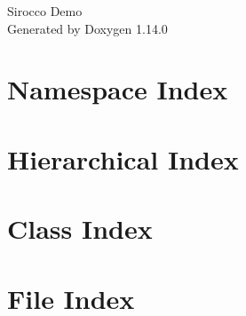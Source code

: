 \documentclass[twoside]{book}
\newcommand{\+}{\discretionary{\mbox{\scriptsize$\hookleftarrow$}}{}{}}
\newcommand{\clearemptydoublepage}{%
    \newpage{\pagestyle{empty}\cleardoublepage}%
  }
\begin{document}
  \raggedbottom
    \hypersetup{pageanchor=false,
                bookmarksnumbered=true,
                pdfencoding=unicode
               }
  \begin{titlepage}
  \vspace*{7cm}
  \begin{center}%
  {\Large Sirocco Demo}\\
  \vspace*{1cm}
  {\large Generated by Doxygen 1.14.0}\\
  \end{center}
  \end{titlepage}
  \clearemptydoublepage
  \tableofcontents
  \clearemptydoublepage
  \hypersetup{pageanchor=true}





\chapter{Namespace Index}

\chapter{Hierarchical Index}

\chapter{Class Index}

\chapter{File Index}

\end{document}
